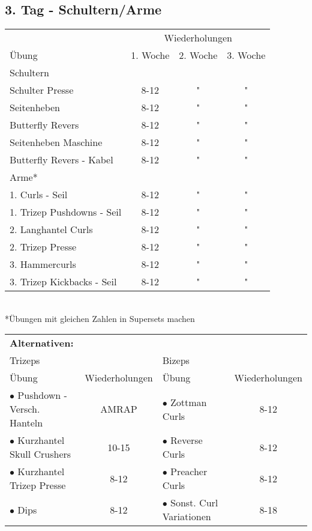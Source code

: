 \documentclass[10pt,a4paper]{article}
\begin{document}
	\subsection{3. Tag - Schultern/Arme}
		\begin{tabular}{l||c|c|c}
			& \multicolumn{3}{c}{Wiederholungen} \\ 
			Übung & 1. Woche & 2. Woche & 3. Woche \\ 
			\hline
			\hline
			\multicolumn{4}{l}{Schultern}	\\
			\hline
			\hline 
			Schulter Presse & 8-12 & " & " \\ 
			\hline 
			Seitenheben	& 8-12 & " & " \\ 
			\hline
			Butterfly Revers & 8-12 & " & " \\ 
			\hline
			Seitenheben Maschine & 8-12	& " & " \\
			\hline
			Butterfly Revers - Kabel & 8-12	& " & " \\
			\hline
			\hline
			\multicolumn{4}{l}{Arme*}	\\
			\hline
			\hline
			1. Curls - Seil	& 8-12	& "	& "	\\
			1. Trizep Pushdowns - Seil	& 8-12	& "	& "	\\
			2. Langhantel Curls	& 8-12	& "	& "	\\
			2. Trizep Presse	& 8-12	& "	& "	\\
			3. Hammercurls	& 8-12	& "	& "	\\
			3. Trizep Kickbacks - Seil	& 8-12	& "	& "	\\
			
		\end{tabular} \\
		*Übungen mit gleichen Zahlen in Supersets machen
		\vspace{1cm}\\
		\begin{tabular}{lc|lc}
			\multicolumn{4}{l}{\textbf{Alternativen:}}	\\
			\multicolumn{2}{l}{Trizeps} & \multicolumn{2}{l}{Bizeps} \\ 
			\hline
			\midrule
			Übung	& Wiederholungen	& Übung	& Wiederholungen	\\
			$\bullet$ Pushdown - Versch. Hanteln	& AMRAP	& $\bullet$ Zottman Curls	& 8-12	\\
			$\bullet$ Kurzhantel Skull Crushers	& 10-15	& $\bullet$ Reverse Curls	& 8-12	\\
			$\bullet$ Kurzhantel Trizep Presse	& 8-12	& $\bullet$ Preacher Curls	& 8-12	\\
			$\bullet$ Dips	& 8-12	& $\bullet$ Sonst. Curl Variationen	& 8-18 \\
		\end{tabular}
\end{document}
